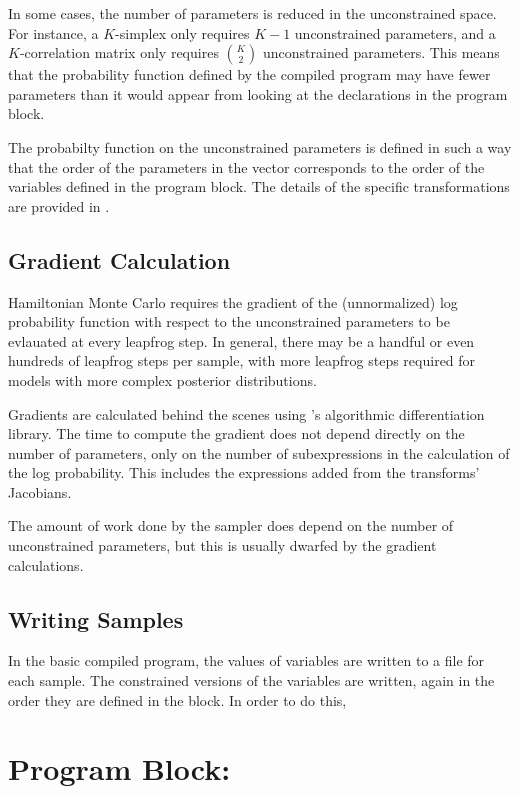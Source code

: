 In some cases, the number of parameters is reduced in the
unconstrained space.  For instance, a $K$-simplex only requires $K-1$
unconstrained parameters, and a $K$-correlation matrix only requires
${K \choose 2}$ unconstrained parameters.  This means that the
probability function defined by the compiled \Stan program may have
fewer parameters than it would appear from looking at the declarations
in the  program block. 

The probabilty function on the unconstrained parameters is defined in
such a way that the order of the parameters in the vector corresponds
to the order of the variables defined in the  program
block.  The details of the specific transformations are provided in
.

\subsection{Gradient Calculation}

Hamiltonian Monte Carlo requires the gradient of the (unnormalized)
log probability function with respect to the unconstrained parameters
to be evlauated at every leapfrog step.  In general, there may be a
handful or even hundreds of leapfrog steps per sample, with more
leapfrog steps required for models with more complex posterior distributions.

Gradients are calculated behind the scenes using \Stan's algorithmic
differentiation library.  The time to compute the gradient does not
depend directly on the number of parameters, only on the number of
subexpressions in the calculation of the log probability.  This
includes the expressions added from the transforms' Jacobians.  

The amount of work done by the sampler does depend on the number of
unconstrained parameters, but this is usually dwarfed by the gradient
calculations.

\subsection{Writing Samples}

In the basic \Stan compiled program, the values of variables are
written to a file for each sample.  The constrained versions of the
variables are written, again in the order they are defined in the
 block.  In order to do this, 


\section{Program Block: }

